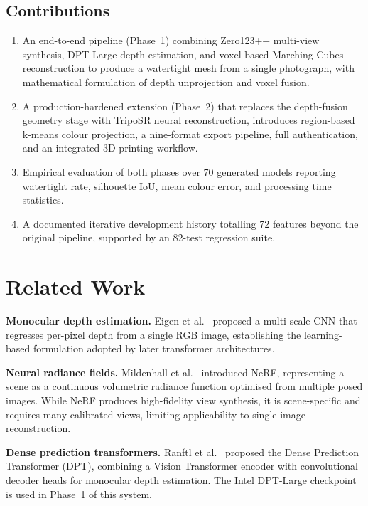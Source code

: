 \documentclass[conference]{IEEEtran}
\begin{document}
\subsection*{Contributions}
\begin{enumerate}
  \item An end-to-end pipeline (Phase~1) combining Zero123++ multi-view synthesis, DPT-Large depth
        estimation, and voxel-based Marching Cubes reconstruction to produce a watertight mesh from
        a single photograph, with mathematical formulation of depth unprojection and voxel fusion.
  \item A production-hardened extension (Phase~2) that replaces the depth-fusion geometry stage with
        TripoSR neural reconstruction, introduces region-based k-means colour projection, a nine-format
        export pipeline, full authentication, and an integrated 3D-printing workflow.
  \item Empirical evaluation of both phases over 70 generated models reporting watertight rate, silhouette
        IoU, mean colour error, and processing time statistics.
  \item A documented iterative development history totalling 72 features beyond the original pipeline,
        supported by an 82-test regression suite.
\end{enumerate}

\section{Related Work}

\textbf{Monocular depth estimation.}
Eigen et al.~\cite{eigen} proposed a multi-scale CNN that regresses per-pixel depth from a single RGB image,
establishing the learning-based formulation adopted by later transformer architectures.

\textbf{Neural radiance fields.}
Mildenhall et al.~\cite{nerf} introduced NeRF, representing a scene as a continuous volumetric radiance function
optimised from multiple posed images. While NeRF produces high-fidelity view synthesis, it is scene-specific and
requires many calibrated views, limiting applicability to single-image reconstruction.

\textbf{Dense prediction transformers.}
Ranftl et al.~\cite{dpt} proposed the Dense Prediction Transformer (DPT), combining a Vision Transformer encoder
with convolutional decoder heads for monocular depth estimation. The Intel DPT-Large checkpoint is used in
Phase~1 of this system.
\end{document}
